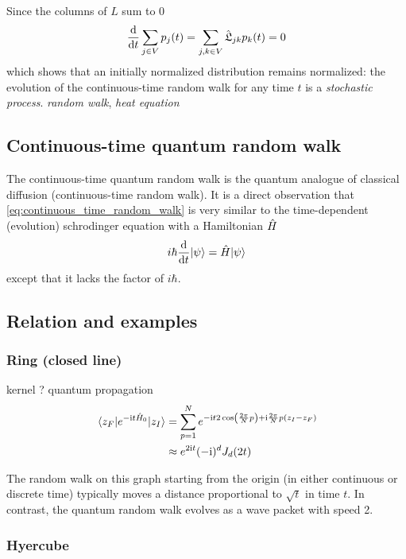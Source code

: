Since the columns of $L$ sum to 0
\begin{equation}
	\dv{t} \sum_{j\in V} p_j (t) = 
	\sum_{j,k\in V} \hat{\mathfrak{L}}_{jk}  p_k(t) = 0
\end{equation}
which shows that an initially normalized distribution remains normalized:
the evolution of the continuous-time random walk for any time $t$ is a \emph{stochastic process}.
\emph{random walk}, \emph{heat equation}

\subsection{Continuous-time quantum random walk}
The continuous-time quantum random walk \cite{childsExampleDifferenceQuantum2002} is the quantum analogue of classical diffusion (continuous-time random walk).
It is a direct observation that \cref{eq:continuous_time_random_walk} is very similar to the time-dependent (evolution) schrodinger equation with a Hamiltonian $\hat{H}$
\begin{equation}
	i\hbar \dv{t} | \psi \rangle = \hat{H} | \psi \rangle
\end{equation}
except that it lacks the factor of $i\hbar$.

\subsection{Relation and examples}
\subsubsection{Ring (closed line)}
kernel ? quantum propagation 
\begin{align}
	\mel{z_F}{e^{-\textup{i}t\hat{H}_0 }}{z_I}
	&=\sum_{p=1}^{N} 
	e^{-\textup{i} t 2\cos(\frac{2\pi}{N}p) +\textup{i} \frac{2\pi}{N} p(z_I-z_F)} 
	\\
	&
	\approx e^{2\textup{i} t} (-\textup{i})^{d} J_{d} (2t)
	\label{eq:ctqrw_kernel}
\end{align}
\begin{remark}
    The random walk on this graph starting from the origin (in either continuous or discrete time)
    typically moves a distance proportional to $\sqrt{t}$ in time $t$.
	In contrast, the quantum random walk evolves as a wave packet with speed 2.
\end{remark}

\subsubsection{Hyercube}


